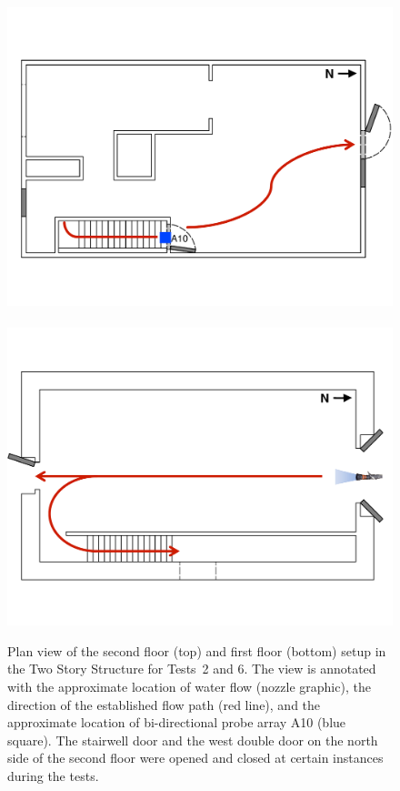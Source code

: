 \documentclass[12pt,oneside]{book}
\begin{document}
\begin{figure}[!ht]
	\includegraphics[width=\columnwidth]{../Figures/Floor_Plans/Specific_Tests/West_Hose_Test_2nd_Floor_Annotated}
	\\~\\
	\includegraphics[width=\columnwidth]{../Figures/Floor_Plans/Specific_Tests/West_Hose_Test_18_1st_Floor_Annotated}
	\caption[Plan view of the Two Story Structure setup for Tests~2 and 6.]{Plan view of the second floor (top) and first floor (bottom) setup in the Two Story Structure for Tests~2 and 6. The view is annotated with the approximate location of water flow (nozzle graphic), the direction of the established flow path (red line), and the approximate location of bi-directional probe array A10 (blue square). The stairwell door and the west double door on the north side of the second floor were opened and closed at certain instances during the tests.}
	\label{fig:flow_path_1}
\end{figure}
\end{document}
